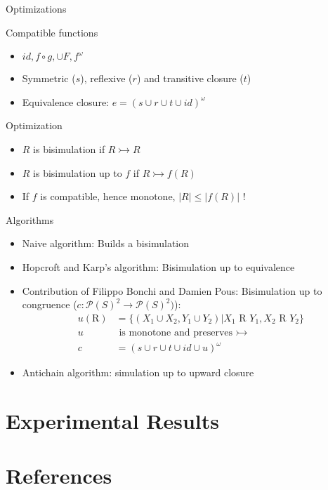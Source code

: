 \documentclass[compress]{beamer}
\begin{document}
\begin{frame}{Optimizations}
  \begin{block}{Compatible functions}
    \begin{itemize}
      \item $id, f \circ g, \cup F, f^\omega$
      \item Symmetric ($s$), reflexive ($r$) and transitive closure ($t$)
      \item Equivalence closure: $e = (s \cup r \cup t \cup id)^\omega$
    \end{itemize}
  \end{block}

  \begin{block}{Optimization}
    \begin{itemize}
      \item $R$ is bisimulation if $R \rightarrowtail R$
      \item $R$ is bisimulation up to $f$ if $R \rightarrowtail f(R)$
      \item If $f$ is compatible, hence monotone, $|R| \leq |f(R)|$ !
    \end{itemize}
  \end{block}
\end{frame}

\begin{frame}{Algorithms}
  \begin{itemize}
    \item Naive algorithm: Builds a bisimulation
    \item Hopcroft and Karp's algorithm: Bisimulation up to equivalence
    \item Contribution of Filippo Bonchi and Damien Pous:
      Bisimulation up to congruence ($c : \mathcal{P}(S)^2 \to \mathcal{P}(S)^2)$):\\
        \begin{align}
          u(\text{R}) &= \{(X_1 \cup X_2, Y_1 \cup Y_2) | X_1 \text{ R } Y_1, X_2 \text{ R } Y_2\}\\
          u&\text{ is monotone and preserves }\rightarrowtail\\
          c &= (s \cup r \cup t \cup id \cup u)^\omega
        \end{align}
    \item Antichain algorithm: simulation up to upward closure
  \end{itemize}
\end{frame}

\section{Experimental Results}

\section{References}
\end{document}
